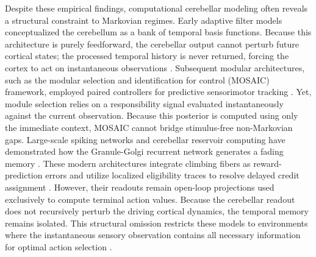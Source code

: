 \documentclass[12pt, a4paper]{extarticle}
\begin{document}
	Despite these empirical findings, computational cerebellar modeling often reveals a structural constraint to Markovian regimes. Early adaptive filter models conceptualized the cerebellum as a bank of temporal basis functions. Because this architecture is purely feedforward, the cerebellar output cannot perturb future cortical states; the processed temporal history is never returned, forcing the cortex to act on instantaneous observations \parencite{fujitaAdaptiveFilterModel1982}. Subsequent modular architectures, such as the modular selection and identification for control (MOSAIC) framework, employed paired controllers for predictive sensorimotor tracking \parencite{harunoMosaicModelSensorimotor2001, mehtaForwardModelsVisuomotor2002}. Yet, module selection relies on a responsibility signal evaluated instantaneously against the current observation. Because this posterior is computed using only the immediate context, MOSAIC cannot bridge stimulus-free non-Markovian gaps. Large-scale spiking networks and cerebellar reservoir computing have demonstrated how the Granule-Golgi recurrent network generates a fading memory \parencite{hoangPredictiveRewardpredictionErrors2025, yamazakiCerebellumLiquidState2007}. These modern architectures integrate climbing fibers as reward-prediction errors \parencite{jinRewarddrivenCerebellarClimbing2024} and utilize localized eligibility traces to resolve delayed credit assignment \parencite{verduzco-floresHowCreditAssignment2015, doyaWhatAreComputations1999}. However, their readouts remain open-loop projections used exclusively to compute terminal action values. Because the cerebellar readout does not recursively perturb the driving cortical dynamics, the temporal memory remains isolated. This structural omission restricts these models to environments where the instantaneous sensory observation contains all necessary information for optimal action selection \parencite{kakeiConsensusPaperModels2026, miallStateEstimationCerebellum2008}.
	
\end{document}
